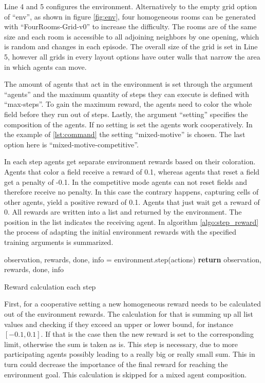 Line 4 and 5 configures the environment. Alternatively to the empty grid option of ``env'', as shown in figure \ref{fig:env}, four homogeneous rooms can be generated with ``FourRooms-Grid-v0'' to increase the difficulty. The rooms are of the same size and each room is accessible to all adjoining neighbors by one opening, which is random and changes in each episode. The overall size of the grid is set in Line 5, however all grids in every layout options have outer walls that narrow the area in which agents can move.

The amount of agents that act in the environment is set through the argument ``agents'' and the maximum quantity of steps they can execute is defined with ``max-steps''. To gain the maximum reward, the agents need to color the whole field before they run out of steps. Lastly, the argument ``setting'' specifies the composition of the agents. If no setting is set the agents work cooperatively. In the example of \ref{lst:command} the setting ``mixed-motive'' is chosen. The last option here is ``mixed-motive-competitive''. %

In each step agents get separate environment rewards based on their coloration. Agents that color a field receive a reward of 0.1, whereas agents that reset a field get a penalty of -0.1. In the competitive mode agents can not reset fields and therefore receive no penalty. In this case the contrary happens, capturing cells of other agents, yield a positive reward of 0.1. Agents that just wait get a reward of 0. All rewards are written into a list and returned by the environment. The position in the list indicates the receiving agent. In algorithm \ref{algo:step_reward} the process of adapting the initial environment rewards with the specified training arguments is summarized.

\begin{algorithm}[H]
    \DontPrintSemicolon
    observation, rewards, done, info = environment.step(actions)\;
    \textbf{return} observation, rewards, done, info\;
    \caption{Reward calculation each step}\label{algo:step_reward}
\end{algorithm}

First, for a cooperative setting a new homogeneous reward needs to be calculated out of the environment rewards. The calculation for that is summing up all list values and checking if they exceed an upper or lower bound, for instance $[-0.1,0.1]$. If that is the case then the new reward is set to the corresponding limit, otherwise the sum is taken as is. This step is necessary, due to more participating agents possibly leading to a really big or really small sum. This in turn could decrease the importance of the final reward for reaching the environment goal. This calculation is skipped for a mixed agent composition.

